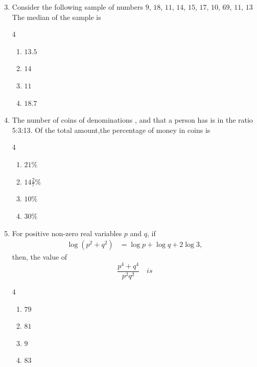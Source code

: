 \documentclass[journal]{IEEEtran}
\theoremstyle{remark}
\begin{document}
\begin{enumerate}[itemsep=1em]
\setcounter{enumi}{2}

\item Consider the following sample of numbers\:
    $9$, $18$, $11$, $14$, $15$, $17$, $10$, $69$, $11$, $13$
    The median of the sample is 
\begin{multicols}{4}
\begin{enumerate}[label=\Alph*)]
        \item $13.5$
        \item $14$
        \item $11$
        \item $18.7$\\
    \end{enumerate}
\end{multicols}
\end{enumerate}


 \begin{enumerate}[itemsep=1em]
\setcounter{enumi}{3}
\item The number of coins of denominations ,  and  that a person has is in the ratio 5:3:13. Of the total amount,the percentage of money in  coins is
\begin{multicols}{4}
\begin{enumerate}[label=\Alph*)]
        \item $21\%$
        \item $14\tfrac{2}{7}\%$
        \item $10\%$
        \item $30\%$\\
    \end{enumerate}
\end{multicols}
\end{enumerate}

\newpage
\vspace*{0.25cm}



\begin{enumerate}[itemsep=1em]
\setcounter{enumi}{4}
\item For positive non-zero real variables $p$ and $q$, if 
\begin{align*}
    \log \left( p^2 + q^2 \right) &= \log p + \log q + 2 \log 3,
\end{align*}
then, the value of 
\[
    \frac{p^4 + q^4}{p^2 q^2} \quad is
\]
\begin{multicols}{4}
\begin{enumerate}[label=\Alph*)]
        \item $79$
        \item $81$
        \item $9$
        \item $83$
    \end{enumerate}
\end{multicols}
\end{enumerate}
\vspace*{0.5cm}
\end{document}

